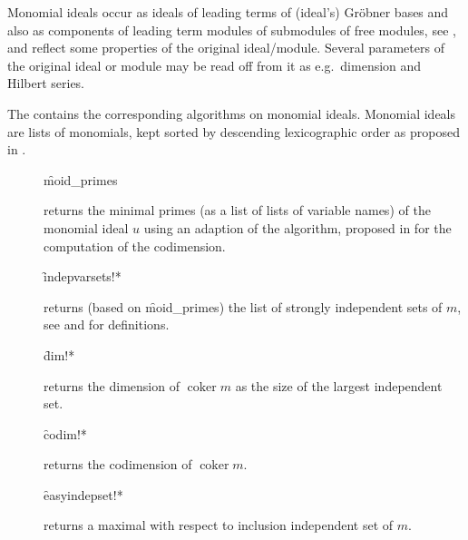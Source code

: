 Monomial ideals occur as ideals of leading terms of (ideal's) Gr\"obner
bases and also as components of leading term modules of submodules of
free modules, see \cite{Graebe:93a}, and reflect some properties of the
original ideal/module. Several parameters of the original ideal or
module may be read off from it as e.g.\ dimension and Hilbert series.

The  contains the corresponding algorithms on
monomial ideals. Monomial ideals are lists of monomials, kept sorted
by descending lexicographic order as proposed in \cite{BayerStillman:92}.

\begin{description}

\item[]
  \begin{syntax}
    \f{moid\_primes} 
  \end{syntax}
  \hypertarget{procedure:MOID_PRIMES}{}
returns the minimal primes (as a list of lists of variable
names) of the monomial ideal $u$ using an adaption of the algorithm,
proposed in \cite{BayerStillman:92} for the computation of the codimension.

\item[]
  \begin{syntax}
    \f{indepvarsets!*} 
  \end{syntax}
  \hypertarget{procedure:INDEPVARSETS!*}{}
returns (based on \f{moid\_primes}) the list of strongly
independent sets of $m$, see \cite{Kredel:88a} and \cite{Graebe:93a} for
definitions.

\item[]
  \begin{syntax}
    \f{dim!*} 
  \end{syntax}
  \hypertarget{procedure:DIM!*}{}
returns the dimension of $\mathop{\mathrm{coker}} m$ as the size of the largest
independent set.

\item[]
  \begin{syntax}
    \f{codim!*} 
  \end{syntax}
  \hypertarget{procedure:CODIM!*}{}
returns the codimension of $\mathop{\mathrm{coker}} m$.

\item[]
  \begin{syntax}
    \f{easyindepset!*} 
  \end{syntax}
  \hypertarget{procedure:EASYINDEPSET!*}{}
returns a maximal with respect to inclusion independent set of
$m$.


\end{description}
